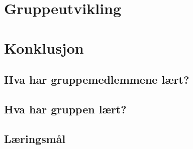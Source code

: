 \documentclass[DIV=calc, paper=a4, fontsize=12pt]{scrartcl}	 %
\begin{document}
\begin{multicols}{2}

\end{multicols}


\section{Gruppeutvikling}

\begin{multicols}{2}






%


\end{multicols}


\section{Konklusjon}

\begin{multicols}{2}

\subsection{Hva har gruppemedlemmene lært?}



\subsection{Hva har gruppen lært?}

\subsection{Læringsmål}

\end{multicols}



\onecolumn
\small{

}


\pagebreak


\end{document}
